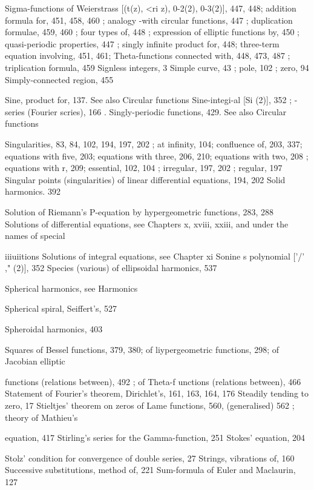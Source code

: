 Sigma-functions of Weierstrass [(t(z), <ri z), 0-2(2), 0-3(2)], 447, 448; addition formula for, 451,
458, 460 ; analogy -with circular functions, 447 ; duplication formulae, 459, 460 ; four
types of, 448 ; expression of elliptic functions by, 450 ; quasi-periodic properties, 447 ;
singly infinite product for, 448; three-term equation involving, 451, 461; Theta-functions
connected with, 448, 473, 487 ; triplication formula, 459
Signless integers, 3
Simple curve, 43 ; pole, 102 ; zero, 94
Simply-connected region, 455

Sine, product for, 137. See also Circular functions
Sine-integi-al [Si (2)], 352 ; -series (Fourier scries), 166 .
Singly-periodic functions, 429. See also Circular functions

Singularities, 83, 84, 102, 194, 197, 202 ; at infinity, 104; confluence of, 203, 337; equations
with five, 203; equations with three, 206, 210; equations with two, 208 ; equations with r,
209; essential, 102, 104 ; irregular, 197, 202 ; regular, 197
Singular points (singularities) of linear differential equations, 194, 202
Solid harmonics. 392

Solution of Riemann's P-equation by hypergeometric functions, 283, 288
Solutions of differential equations, see Chapters x, xviii, xxiii, and under the names of special

iiiuiitions
Solutions of integral equations, see Chapter xi
Sonine s polynomial ['/' ," (2)], 352
Species (various) of ellipsoidal harmonics, 537


%
%

Spherical harmonics, see Harmonics

Spherical spiral, Seiffert's, 527

Spheroidal harmonics, 403

Squares of Bessel functions, 379, 380; of liypergeometric functions, 298; of Jacobian elliptic

functions (relations between), 492 ; of Theta-f unctions (relations between), 466
Statement of Fourier's theorem, Dirichlet's, 161, 163, 164, 176
Steadily tending to zero, 17
Stieltjes' theorem on zeros of Lame functions, 560, (generalised) 562 ; theory of Mathieu's

equation, 417
Stirling's series for the Gamma-function, 251
Stokes' equation, 204

Stolz' condition for convergence of double series, 27
Strings, vibrations of, 160
Successive substitutions, method of, 221
Sum-formula of Euler and Maclaurin, 127

